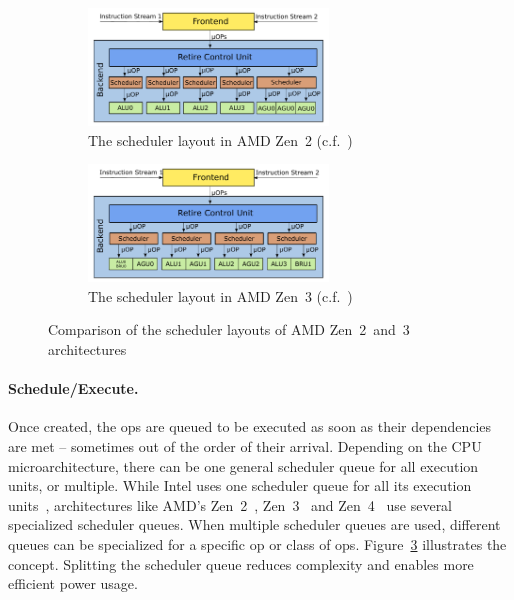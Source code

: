 \documentclass[11pt,
  titlepage=false,
  parskip=half,      %
]{scrreprt}
\begin{document}
\begin{figure}
    \centering
    \begin{subfigure}[b]{\textwidth}
        \centering
        \includegraphics[width=0.7\textwidth]{figures/Zen2 arch}
        \caption{The scheduler layout in AMD Zen~2 (c.f.~\cite{AMD2020OptimizationEPYC7002})}
        \label{fig:amdzen2}
    \end{subfigure}

    \begin{subfigure}[b]{\textwidth}
        \centering
        \includegraphics[width=0.7\textwidth]{figures/Zen3 arch}
        \caption{The scheduler layout in AMD Zen~3 (c.f.~\cite{AMD2020OptimizationEPYC7003})}
        \label{fig:amdzen3}
    \end{subfigure}
    \caption{Comparison of the scheduler layouts of AMD Zen~2~and~3 architectures}
    \label{fig:amdzencomparison}
\end{figure}

\paragraph{Schedule/Execute.}
Once created, the \textmu ops are queued to be executed as soon as their dependencies are met -- sometimes out of the order of their arrival.
Depending on the CPU microarchitecture, there can be one general scheduler queue for all execution units, or multiple.
While Intel uses one scheduler queue for all its execution units~\cite{Intel_opt},
architectures like AMD's Zen~2~\cite{AMD2020OptimizationEPYC7002}, Zen~3~\cite{AMD2020OptimizationEPYC7003} and Zen~4~\cite{AMD2023OptimizationZen4} use several specialized scheduler queues.
When multiple scheduler queues are used, different queues can be specialized for a specific \textmu op or class of \textmu ops.
Figure~\ref{fig:amdzencomparison} illustrates the concept.
Splitting the scheduler queue reduces complexity and enables more efficient power usage.
\end{document}
